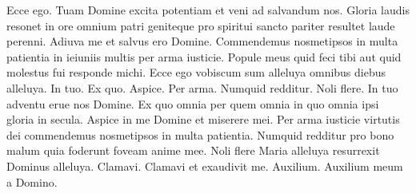 \begin{multicols*}{2}
 Ecce ego.
 Tuam Domine excita potentiam et veni ad salvandum nos.
 Gloria laudis resonet in ore omnium patri geniteque pro spiritui sancto pariter resultet laude perenni.
 Adiuva me et salvus ero Domine.
 Commendemus nosmetipsos in multa patientia in ieiuniis multis per arma iusticie.
 Popule meus quid feci tibi aut quid molestus fui responde michi.
 Ecce ego vobiscum sum alleluya omnibus diebus alleluya.
 In tuo.
 Ex quo.
 Aspice.
 Per arma.
 Numquid redditur.
 Noli flere.
 In tuo adventu erue nos Domine.
 Ex quo omnia per quem omnia in quo omnia ipsi gloria in secula.
 Aspice in me Domine et miserere mei.
 Per arma iusticie virtutis dei commendemus nosmetipsos in multa patientia.
 Numquid redditur pro bono malum quia foderunt foveam anime mee.
 Noli flere Maria alleluya resurrexit Dominus alleluya.
 Clamavi.
 Clamavi et exaudivit me.
 Auxilium.
 Auxilium meum a Domino.

\end{multicols*}
